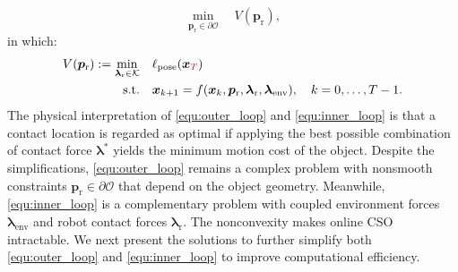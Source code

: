 \begin{equation}
 \min_{\boldsymbol{p}_{\text{r}} \in \partial \mathcal{O}}
 \quad V(\boldsymbol{p}_{\text{r}})\label{equ:outer_loop},
\end{equation}
in which:
\begin{equation}
\begin{aligned}
V(\boldsymbol{p}_{\text{r}})
:= \min_{\boldsymbol{\lambda}_{\text{r}} \in \mathcal{K}} \quad &
\ell_{\text{pose}}(\boldsymbol{x}_{\textcolor{red}{T}}) \\
\text{s.t.} \quad
& \boldsymbol{x}_{k+1}
= f(\boldsymbol{x}_k, \boldsymbol{p}_{\text{r}}, \boldsymbol{\lambda}_{\text{r}}, \boldsymbol{\lambda}_{\text{env}}),
\quad k = 0, \dots, T-1.
\end{aligned}\label{equ:inner_loop}
\end{equation}
\noindent The physical interpretation of \eqref{equ:outer_loop} and \eqref{equ:inner_loop} is that a contact location is regarded as optimal if applying the best possible combination of contact force $\boldsymbol{\lambda}^*$ yields the minimum motion cost of the object. Despite the simplifications, \eqref{equ:outer_loop} remains a complex problem with nonsmooth constraints $\boldsymbol{p}_{\text{r}} \in \partial \mathcal{O}$ that depend on the object geometry. Meanwhile, \eqref{equ:inner_loop} is a complementary problem with coupled environment forces $\boldsymbol{\lambda}_{\text{env}}$ and robot contact forces $\boldsymbol{\lambda}_{\text{r}}$. The nonconvexity makes online CSO intractable. We next present the solutions to further simplify both \eqref{equ:outer_loop} and \eqref{equ:inner_loop} to improve computational efficiency.

